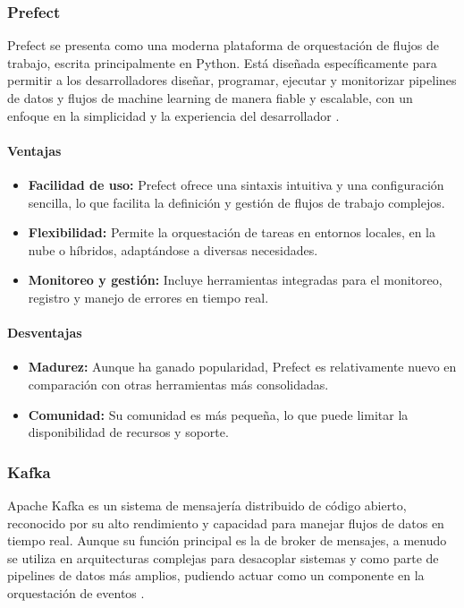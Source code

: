 \subsubsection{Prefect}
Prefect se presenta como una moderna plataforma de orquestación de flujos de trabajo, escrita principalmente en Python. Está diseñada específicamente para permitir a los desarrolladores diseñar, programar, ejecutar y monitorizar pipelines de datos y flujos de machine learning de manera fiable y escalable, con un enfoque en la simplicidad y la experiencia del desarrollador \cite{noauthor_pythonic_nodate}.

\paragraph{Ventajas}
\begin{itemize}
    \item \textbf{Facilidad de uso:} Prefect ofrece una sintaxis intuitiva y una configuración sencilla, lo que facilita la definición y gestión de flujos de trabajo complejos.
    \item \textbf{Flexibilidad:} Permite la orquestación de tareas en entornos locales, en la nube o híbridos, adaptándose a diversas necesidades.
    \item \textbf{Monitoreo y gestión:} Incluye herramientas integradas para el monitoreo, registro y manejo de errores en tiempo real.
\end{itemize}

\paragraph{Desventajas}
\begin{itemize}
    \item \textbf{Madurez:} Aunque ha ganado popularidad, Prefect es relativamente nuevo en comparación con otras herramientas más consolidadas.
    \item \textbf{Comunidad:} Su comunidad es más pequeña, lo que puede limitar la disponibilidad de recursos y soporte.
\end{itemize}

\subsubsection{Kafka}
Apache Kafka es un sistema de mensajería distribuido de código abierto, reconocido por su alto rendimiento y capacidad para manejar flujos de datos en tiempo real. Aunque su función principal es la de broker de mensajes, a menudo se utiliza en arquitecturas complejas para desacoplar sistemas y como parte de pipelines de datos más amplios, pudiendo actuar como un componente en la orquestación de eventos \cite{noauthor_apache_nodate}.

